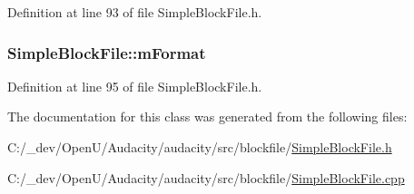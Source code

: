 Definition at line 93 of file Simple\+Block\+File.\+h.

\subsubsection[{\texorpdfstring{m\+Format}{mFormat}}]{ Simple\+Block\+File\+::m\+Format\hspace{0.3cm}{\ttfamily [protected]}}\hypertarget{class_simple_block_file_ad40b5fc5ff95595d2717c0fa0dd75596}{}\label{class_simple_block_file_ad40b5fc5ff95595d2717c0fa0dd75596}


Definition at line 95 of file Simple\+Block\+File.\+h.



The documentation for this class was generated from the following files\+:\begin{DoxyCompactItemize}
\item 
C\+:/\+\_\+dev/\+Open\+U/\+Audacity/audacity/src/blockfile/\hyperlink{_simple_block_file_8h}{Simple\+Block\+File.\+h}\item 
C\+:/\+\_\+dev/\+Open\+U/\+Audacity/audacity/src/blockfile/\hyperlink{_simple_block_file_8cpp}{Simple\+Block\+File.\+cpp}\end{DoxyCompactItemize}
